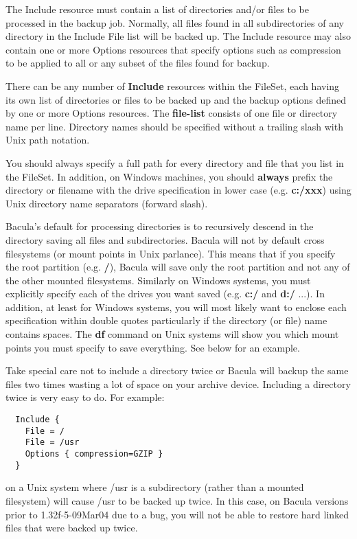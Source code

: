 The Include resource must contain a list of directories and/or files to be
processed in the backup job.  Normally, all files found in all
subdirectories of any directory in the Include File list will be backed up.
The Include resource may also contain one or more Options resources that
specify options such as compression to be applied to all or any subset of
the files found for backup.

There can be any number of {\bf Include} resources within the FileSet, each
having its own list of directories or files to be backed up and the backup
options defined by one or more Options resources.  The {\bf file-list}
consists of one file or directory name per line.  Directory names should be
specified without a trailing slash with Unix path notation.

You should always specify a full path for every directory and file that you
list in the FileSet.  In addition, on Windows machines, you should {\bf
always} prefix the directory or filename with the drive specification in
lower case (e.g.  {\bf c:/xxx}) using Unix directory name separators
(forward slash).

Bacula's default for processing directories is to recursively descend in
the directory saving all files and subdirectories.  Bacula will not by
default cross filesystems (or mount points in Unix parlance).  This means
that if you specify the root partition (e.g.  {\bf /}), Bacula will save
only the root partition and not any of the other mounted filesystems.
Similarly on Windows systems, you must explicitly specify each of the
drives you want saved (e.g.
{\bf c:/} and {\bf d:/} ...). In addition, at least for Windows systems, you
will most likely want to enclose each specification within double quotes
particularly if the directory (or file) name contains spaces. The {\bf df}
command on Unix systems will show you which mount points you must specify to
save everything. See below for an example. 

Take special care not to include a directory twice or Bacula will backup
the same files two times wasting a lot of space on your archive device.
Including a directory twice is very easy to do.  For example:

\footnotesize
\begin{verbatim}
  Include {
    File = /
    File = /usr
    Options { compression=GZIP }
  }
\end{verbatim}
\normalsize

on a Unix system where /usr is a subdirectory (rather than a mounted
filesystem) will cause /usr to be backed up twice. In this case, on Bacula
versions prior to 1.32f-5-09Mar04 due to a bug, you will not be able to
restore hard linked files that were backed up twice. 

